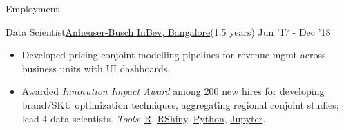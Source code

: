 \documentclass[]{mcdowellcv}
\begin{document}
\begin{cvsection}{Employment}
        \begin{cvsubsection}{Data Scientist}{\href{https://www.ab-inbev.com/}{Anheuser-Busch InBev, Bangalore}}{(1.5 years) Jun '17 - Dec '18}
            \begin{itemize}
                \item Developed pricing conjoint modelling pipelines for revenue mgmt across business units with UI dashboards.
                \item Awarded \textit{Innovation Impact Award} among 200 new hires for developing brand/SKU optimization techniques, aggregating regional conjoint studies; lead 4 data scientists. \textit{Tools}: \href{https://www.r-project.org/about.html}{R}, \href{https://shiny.rstudio.com/}{RShiny}, \href{https://www.python.org/}{Python}, \href{https://jupyter.org/}{Jupyter}.
            \end{itemize}
        \end{cvsubsection}
    \end{cvsection}
\end{document}
